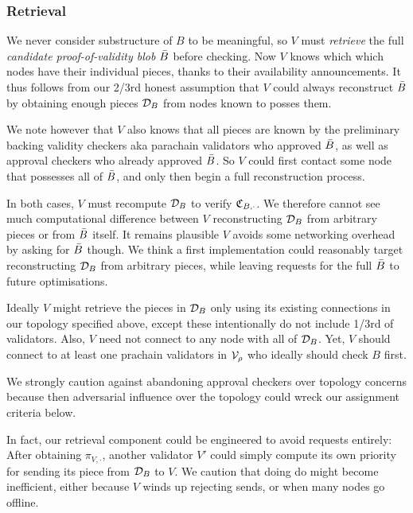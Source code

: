 \subsubsection{Retrieval}
\label{sec:retrieval}

We never consider substructure of $B$ to be meaningful, so $V$ must {\em retrieve} the full {\em candidate proof-of-validity blob} $\bar{B}$ before checking.  Now $V$ knows which which nodes have their individual pieces, thanks to their availability announcements.  It thus follows from our 2/3rd honest assumption that $V$ could always reconstruct $\bar{B}$ by obtaining enough pieces $\mathcal{D}_B$ from nodes known to posses them.  

We note however that $V$ also knows that all pieces are known by the preliminary backing validity checkers aka parachain validators who approved $\bar{B}$, as well as approval checkers who already approved $\bar{B}$.  So $V$ could first contact some node that possesses all of $\bar{B}$, and only then begin a full reconstruction process. 

In both cases, $V$ must recompute $\mathcal{D}_B$ to verify $\mathfrak{C}_{B,\cdot}$.  We therefore cannot see much computational difference between $V$ reconstructing $\mathcal{D}_B$ from arbitrary pieces or from $\bar{B}$ itself.  It remains plausible $V$ avoids some networking overhead by asking for $\bar{B}$ though.  We think a first implementation could reasonably target reconstructing $\mathcal{D}_B$ from arbitrary pieces, while leaving requests for the full $\bar{B}$ to future optimisations. 

Ideally $V$ might retrieve the pieces in $\mathcal{D}_B$ only using its existing connections in our topology specified above, except these intentionally do not include 1/3rd of validators.  Also, $V$ need not connect to any node with all of $\mathcal{D}_B$.  Yet, $V$ should connect to at least one prachain validators in $\mathcal{V}_\rho$ who ideally should check $B$ first.  

We strongly caution against abandoning approval checkers over topology concerns because then adversarial influence over the topology could wreck our assignment criteria below.

In fact, our retrieval component could be engineered to avoid requests entirely:  After obtaining $\pi_{V,\cdot}$, another validator $V'$ could simply compute its own priority for sending its piece from $\mathcal{D}_B$ to $V$.  We caution that doing do might become inefficient, either because $V$ winds up rejecting sends, or when many nodes go offline.  

